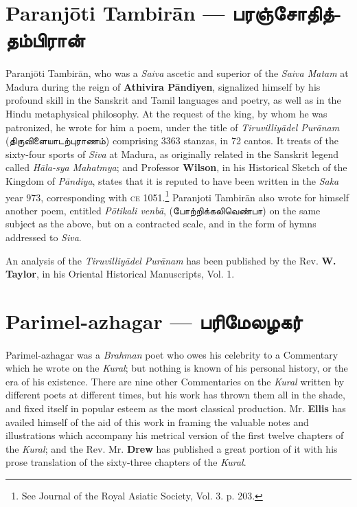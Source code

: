 \documentclass{article}
\newcommand{\TamilText}[1]{\texttamil{#1}}
\newcommand{\TamilBold}[1]{\texttamil{\textbf{#1}}}
\newcommand{\tam}[1]{\TamilText{#1}}
\newcommand{\tambold}[1]{\TamilBold{#1}}
\begin{document}
\section{Paranj\={o}ti Tambir\={a}n --- \tambold{பரஞ்சோதித்தம்பிரான்}}
\paragraph{}
Paranj\={o}ti Tambir\={a}n, who was a \emph{Saiva} ascetic and superior of the \emph{Saiva Matam} at Madura during the reign of \textbf{Athivira P\={a}ndiyen}, signalized himself by his profound skill in the Sanskrit and Tamil languages and poetry, as well as in the Hindu metaphysical philosophy. At the request of the king, by whom he was patronized, he wrote for him a poem, under the title of \emph{Tiruvilliy\={a}del Pur\={a}nam} (\tam{திருவிளையாடற்புராணம்}) comprising 3363 stanzas, in 72 cantos. It treats of the sixty-four sports of \emph{Siva} at Madura, as originally related in the Sanskrit legend called \emph{H\={a}la-sya Mahatmya}; and Professor \textbf{Wilson}, in his Historical Sketch of the Kingdom of \emph{P\={a}ndiya}, states that it is reputed to have been written in the \emph{Saka} year 973, corresponding with \textsc{ce} 1051.\footnote{See Journal of the Royal Asiatic Society, Vol. 3. p. 203.} Paranjoti Tambir\={a}n also wrote for himself another poem, entitled \emph{P\={o}tikali venb\={a}}, (\tam{போற்றிக்கலிவெண்பா}) on the same subject as the above, but on a contracted scale, and in the form of hymns addressed to \emph{Siva}.

An analysis of the \emph{Tiruvilliy\={a}del Pur\={a}nam} has been published by the Rev. \textbf{W. Taylor}, in his Oriental Historical Manuscripts, Vol. 1.

\section{Parimel-azhagar --- \tambold{பரிமேலழகர்}}
\paragraph{}
Parimel-azhagar was a \emph{Brahman} poet who owes his celebrity to a Commentary which he wrote on the \emph{Kural}; but nothing is known of his personal history, or the era of his existence. There are nine other Commentaries on the \emph{Kural} written by different poets at different times, but his work has thrown them all in the shade, and fixed itself in popular esteem as the most classical production. Mr. \textbf{Ellis} has availed himself of the aid of this work in framing the valuable notes and illustrations which accompany his metrical version of the first twelve chapters of the \emph{Kural}; and the Rev. Mr. \textbf{Drew} has published a great portion of it with his prose translation of the sixty-three chapters of the \emph{Kural}.
\end{document}
